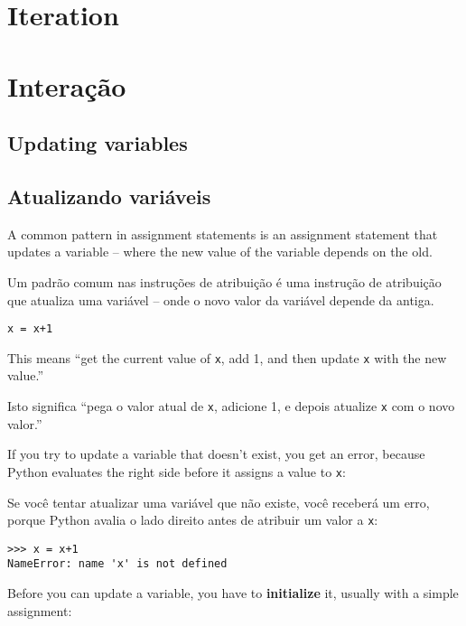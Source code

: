 
\chapter{Iteration}
\chapter{Interação}

\section{Updating variables}
\label{update}
\section{Atualizando variáveis}
\label{update}


A common pattern in assignment statements is an assignment statement
that updates a variable -- 
where the new value of the variable depends on the old.

Um padrão comum nas instruções de atribuição é uma instrução de atribuição
que atualiza uma variável -- onde o novo valor da variável depende da antiga.

\beforeverb
\begin{verbatim}
x = x+1
\end{verbatim}
\afterverb
%
This means ``get the current value of {\tt x}, add 1, and then
update {\tt x} with the new value.''

%
Isto significa ``pega o valor atual de {\tt x}, adicione 1, e depois atualize
{\tt x} com o novo valor.''

If you try to update a variable that doesn't exist, you get an
error, because Python evaluates the right side before it assigns
a value to {\tt x}:

Se você tentar atualizar uma variável que não existe, você receberá um erro,
porque Python avalia o lado direito antes de atribuir um valor a {\tt x}:

\beforeverb
\begin{verbatim}
>>> x = x+1
NameError: name 'x' is not defined
\end{verbatim}
\afterverb
%
Before you can update a variable, you have to {\bf initialize}
it, usually with a simple assignment:

